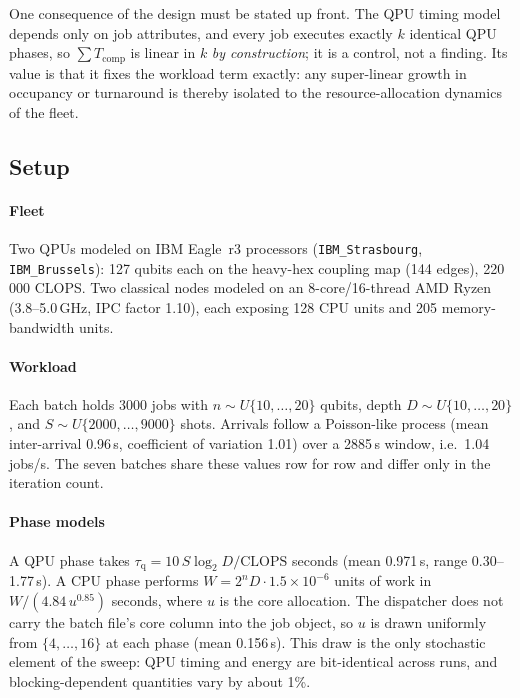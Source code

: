 One consequence of the design must be stated up front. The QPU timing model
depends only on job attributes, and every job executes exactly $k$ identical
QPU phases, so $\sum T_{\mathrm{comp}}$ is linear in $k$ \emph{by
construction}; it is a control, not a finding. Its value is that it fixes the
workload term exactly: any super-linear growth in occupancy or turnaround is
thereby isolated to the resource-allocation dynamics of the fleet.

\subsection{Setup}
\label{sec:eval-setup}

\paragraph{Fleet}
Two QPUs modeled on IBM Eagle~r3 processors (\texttt{IBM\_Strasbourg},
\texttt{IBM\_Brussels}): 127 qubits each on the heavy-hex coupling map
(144 edges), 220\,000 CLOPS. Two classical nodes modeled on an
8-core/16-thread AMD Ryzen (3.8--5.0\,GHz, IPC factor 1.10), each exposing
128 CPU units and 205 memory-bandwidth units.

\paragraph{Workload}
Each batch holds 3000 jobs with $n \sim U\{10,\dots,20\}$ qubits, depth
$D \sim U\{10,\dots,20\}$, and $S \sim U\{2000,\dots,9000\}$ shots. Arrivals
follow a Poisson-like process (mean inter-arrival 0.96\,s, coefficient of
variation 1.01) over a 2885\,s window, i.e.\ 1.04 jobs/s. The seven batches
share these values row for row and differ only in the iteration count.

\paragraph{Phase models}
A QPU phase takes $\tau_{\mathrm{q}} = 10\,S \log_2 D / \mathrm{CLOPS}$
seconds (mean 0.971\,s, range 0.30--1.77\,s). A CPU phase performs
$W = 2^{n} D \cdot 1.5\times10^{-6}$ units of work in $W / (4.84\,u^{0.85})$
seconds, where $u$ is the core allocation. The dispatcher does not carry the
batch file's core column into the job object, so $u$ is drawn uniformly from
$\{4,\dots,16\}$ at each phase (mean 0.156\,s). This draw is the only
stochastic element of the sweep: QPU timing and energy are bit-identical
across runs, and blocking-dependent quantities vary by about 1\%.

